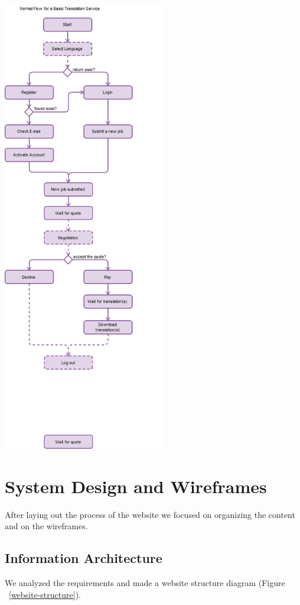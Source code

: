 \documentclass{l3proj}
\begin{document}
\newpage
\includegraphics[height=750px, width=\linewidth]{upc}

\section{System Design and Wireframes}
After laying out the process of the website we focused on organizing the content
and on the wireframes.

\subsection{Information Architecture}
We analyzed the requirements and made a website structure diagram
(Figure ~\ref{website-structure}).
\end{document}
